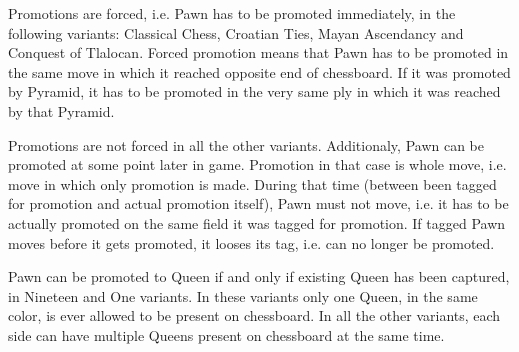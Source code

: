 Promotions are forced, i.e. Pawn has to be promoted immediately, in the following
variants: Classical Chess, Croatian Ties, Mayan Ascendancy and Conquest of Tlalocan.
Forced promotion means that Pawn has to be promoted in the same move in which it
reached opposite end of chessboard. If it was promoted by Pyramid, it has to be
promoted in the very same ply in which it was reached by that Pyramid.

Promotions are not forced in all the other variants. Additionaly, Pawn can be promoted
at some point later in game. Promotion in that case is whole move, i.e. move in which
only promotion is made. During that time (between been tagged for promotion and actual
promotion itself), Pawn must not move, i.e. it has to be actually promoted on the same
field it was tagged for promotion. If tagged Pawn moves before it gets promoted, it
looses its tag, i.e. can no longer be promoted.

Pawn can be promoted to Queen if and only if existing Queen has been captured, in
Nineteen and One variants. In these variants only one Queen, in the same color, is
ever allowed to be present on chessboard. In all the other variants, each side can
have multiple Queens present on chessboard at the same time.







\clearpage %
